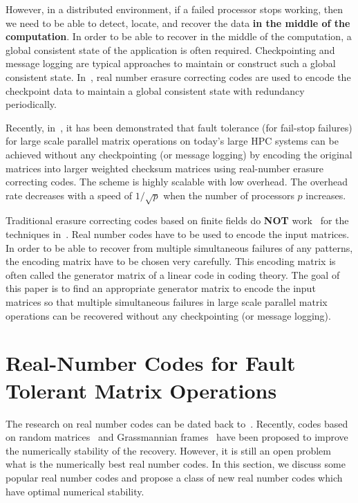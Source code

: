 \documentclass{sig-alternate}
\begin{document}
However, in a distributed environment, if a failed processor stops working,
then we need to be able to detect, locate, and recover the data 
{\bf in the middle of the computation}.
In order to be able to recover in the middle of the computation, 
a global consistent state of the application is often required. 
Checkpointing and message logging are typical approaches to 
maintain or construct such a global consistent state. 
In~\cite{ chen:scalable-checkpointing, 
zchen05:diskless, zchen05:ft-mpi, zchen:dissertation, kim96:abft},
real number erasure correcting codes are used to 
encode the checkpoint data to maintain a global consistent state
with redundancy periodically. 


Recently, in~\cite{chen:abft}, it has been demonstrated that 
fault tolerance (for fail-stop failures) for 
large scale parallel matrix operations on today's
large HPC systems can be achieved without 
any checkpointing (or message logging)
by encoding the original matrices into 
larger weighted checksum matrices
using real-number erasure correcting codes. 
The scheme is highly scalable with low overhead. 
The overhead rate decreases with a speed of $1/\sqrt{p}$ 
when the number of processors $p$ increases. 


Traditional erasure correcting codes based on finite fields do 
{\bf NOT} work~\cite{zchen:random_codes}
for the techniques in~\cite{huang84:abft, chen:abft}. 
Real number codes have to be used to encode the input matrices.
In order to be able to recover from multiple simultaneous failures of any patterns, 
the encoding matrix have to be chosen very carefully. 
This encoding matrix is often called the generator 
matrix of a linear code in coding theory. 
The goal of this paper is to find an appropriate
generator matrix to encode the input matrices
so that multiple simultaneous failures in 
large scale parallel matrix operations can be recovered
without any checkpointing (or message logging).



\section{Real-Number Codes for Fault Tolerant Matrix Operations}


The research on real number codes can be dated back to~\cite{marshall:realcodes}. Recently,
codes based on random matrices~\cite{zchen:random_codes_utk, zchen:random_codes, zchen:random_condition} 
and Grassmannian frames~\cite{goyal: erasure, strohmer03:grassmannian} have been proposed to 
improve the numerically stability of the recovery.
However, it is still an open problem what is the numerically best real number codes. 
In this section, we discuss some popular real number codes and propose
a class of new real number codes which have optimal numerical stability. 
\end{document}
